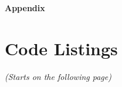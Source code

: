 \documentclass[a4paper, 11pt]{article}
\begin{document}
\newpage
\appendix
\begin{center}
    \LARGE{\textbf{Appendix}}
\end{center}

\section{Code Listings}
\textit{(Starts on the following page)}








\end{document}
